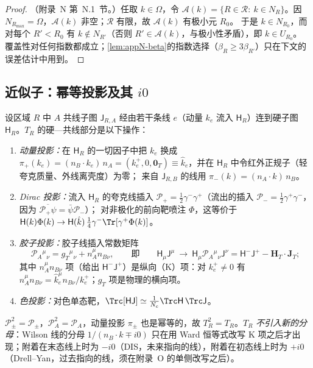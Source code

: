 \begin{proof}
（附录~N 第~N.1~节。）任取 $k\in\Omega$，令 $\mathcal A(k)=\{R\in\mathcal R:\ k\in N_R\}$。因 $N_{R_{\max}}=\Omega$，$\mathcal A(k)$ 非空；$\mathcal R$ 有限，故 $\mathcal A(k)$ 有极小元 $R_0$。
于是 $k\in N_{R_0}$，而对每个 $R'<R_0$ 有 $k\notin N_{R'}$（否则 $R'\in\mathcal A(k)$，与极小性矛盾），即 $k\in U_{R_0}$。
覆盖性对任何指数都成立；\cref{lem:appN-beta}的指数选择（$\beta_R\ge3\beta_{R'}$）只在下文的误差估计中用到。
\end{proof}

\subsection{近似子：幂等投影及其 $i0$}

\begin{definition}\label{def:method-collinear-approx}
设区域 $R$ 中 $A$ 共线子图 $\mathsf J_{R,A}$ 经由若干条线 $e$（动量 $k_e$ 流入 $\mathsf H_R$）连到硬子图 $\mathsf H_R$。$T_R$ 的硬—共线部分是以下操作：
\begin{enumerate}[label=(\roman*),leftmargin=2em,itemsep=1pt,topsep=2pt]
\item \emph{动量投影：}在 $\mathsf H_R$ 的一切因子中把 $k_e$ 换成 $\pi_+(k_e)=(n_B\cdot k_e)\,n_A=(k_e^+,0,\mathbf 0_T)\equiv\hat k_e$，并在 $\mathsf H_R$ 中令红外正规子（轻夸克质量、外线离壳度）为零；
  来自 $\mathsf J_{R,B}$ 的线用 $\pi_-(k)=(n_A\cdot k)\,n_B$。
\item \emph{Dirac 投影：}流入 $\mathsf H_R$ 的夸克线插入 $\mathcal P_+=\frac12\gamma^-\gamma^+$（流出的插入 $\mathcal P_-=\frac12\gamma^+\gamma^-$，因为 $\overline{\mathcal P_+\psi}=\bar\psi\mathcal P_-$）；
  对非极化的前向靶喷注 $\Phi$，这等价于 $\mathsf H(k)\Phi(k)\to\mathsf H(\hat k)\,\frac14\gamma^-\Tr[\gamma^+\Phi(k)]$。
\item \emph{胶子投影：}胶子线插入常数矩阵
  \begin{equation}\label{eq:method-PA}
  \mathcal P_A{}^\mu{}_\nu=g_T{}^\mu{}_\nu+n_A^\mu n_{B\nu},\qquad\text{即}\qquad \mathsf H_\mu\mathsf J^\mu\ \to\ \mathsf H_\mu\mathcal P_A{}^\mu{}_\nu\mathsf J^\nu=\mathsf H^-\mathsf J^+-\mathbf H_T\cdot\mathbf J_T ;
  \end{equation}
  其中 $n_A^\mu n_{B\nu}$ 项（给出 $\mathsf H^-\mathsf J^+$）是纵向（K）项：对 $k_e^+\neq0$ 有 $n_A^\mu n_{B\nu}=\hat k_e^\mu n_{B\nu}/k_e^+$；$g_T$ 项是物理的横向项。
\item \emph{色投影：}对色单态靶，$\Trc[\mathsf H\mathsf J]\simeq\frac1{N_c}\Trc\mathsf H\,\Trc\mathsf J$。
\end{enumerate}
$\mathcal P_\pm^2=\mathcal P_\pm$，$\mathcal P_A^2=\mathcal P_A$，动量投影 $\pi_\pm$ 也是幂等的，故 $T_R^2=T_R$。$T_R$ \emph{不引入新的分母}：Wilson 线的分母 $1/(n_B\cdot k\mp i0)$
只在用 Ward 恒等式改写 K 项之后才出现；附着在末态线上时为 $-i0$（DIS，未来指向的线），附着在初态线上时为 $+i0$（Drell--Yan，过去指向的线，须在附录~O 的单侧改写之后）。
\end{definition}

